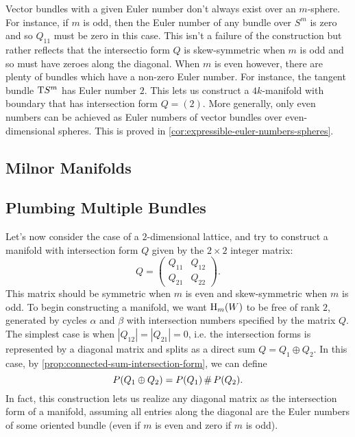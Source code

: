 Vector bundles with a given Euler number don't always exist over an $m$-sphere. For instance, if $m$ is odd, then the Euler number of any bundle over $S^m$ is zero and so $Q_{11}$ must be zero in this case. This isn't a failure of the construction but rather reflects that the intersectio form $Q$ is skew-symmetric when $m$ is odd and so must have zeroes along the diagonal. When $m$ is even however, there are plenty of bundles which have a non-zero Euler number. For instance, the tangent bundle $\operatorname{T\!} S^m$ has Euler number $2$. This lets us construct a $4k$-manifold with boundary that has intersection form $Q = (2)$. More generally, only even numbers can be achieved as Euler numbers of vector bundles over even-dimensional spheres. This is proved in \cref{cor:expressible-euler-numbers-spheres}.

\subsection{Milnor Manifolds}


\subsection{Plumbing Multiple Bundles}

Let's now consider the case of a $2$-dimensional lattice, and try to construct a manifold with intersection form $Q$ given by the $2\times 2$ integer matrix:
\[
	Q = \begin{pmatrix} Q_{11} & Q_{12} \\ Q_{21} & Q_{22}\end{pmatrix}.
\]
This matrix should be symmetric when $m$ is even and skew-symmetric when $m$ is odd. To begin constructing a manifold, we want $\operatorname{H}_m(W)$ to be free of rank $2$, generated by cycles $\alpha$ and $\beta$ with intersection numbers specified by the matrix $Q$. The simplest case is when $|Q_{12}|=|Q_{21}|=0$, i.e. the intersection forms is represented by a diagonal matrix and splits as a direct sum $Q=Q_1\oplus Q_2$. In this case, by \cref{prop:connected-sum-intersection-form}, we can define
\[
	P(Q_1\oplus Q_2) = P(Q_1)\,\#\, P(Q_2).
\]
In fact, this construction lets us realize any diagonal matrix as the intersection form of a manifold, assuming all entries along the diagonal are the Euler numbers of some oriented bundle (even if $m$ is even and zero if $m$ is odd).

